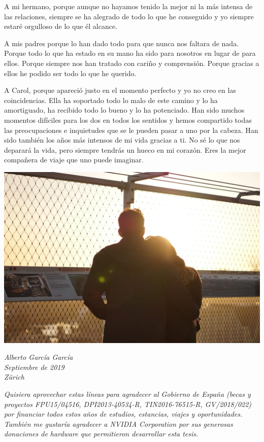 A mi hermano, porque aunque no hayamos tenido la mejor ni la más intensa de las relaciones, siempre se ha alegrado de todo lo que he conseguido y yo siempre estaré orgulloso de lo que él alcance.

A mis padres porque lo han dado todo para que nunca nos faltara de nada. Porque todo lo que ha estado en su mano ha sido para nosotros en lugar de para ellos. Porque siempre nos han tratado con cariño y comprensión. Porque gracias a ellos he podido ser todo lo que he querido.

\newpage

A Carol, porque apareció justo en el momento perfecto y yo no creo en las coincidencias. Ella ha soportado todo lo malo de este camino y lo ha amortiguado, ha recibido todo lo bueno y lo ha potenciado. Han sido muchos momentos difíciles para los dos en todos los sentidos y hemos compartido todas las preocupaciones e inquietudes que se le pueden pasar a uno por la cabeza. Han sido también los años más intensos de mi vida gracias a ti. No sé lo que nos deparará la vida, pero siempre tendrás un hueco en mi corazón. Eres la mejor compañera de viaje que uno puede imaginar.\\

\begin{center}
	\includegraphics[width=0.9\linewidth]{Figures/Ack/carol}
\end{center}

\noindent\emph{Alberto García García}\\
\emph{Septiembre de 2019}\\
\emph{Zürich}\\

\vfill

\emph{Quisiera aprovechar estas líneas para agradecer al Gobierno de España (becas y proyectos FPU15/04516, DPI2013-40534-R, TIN2016-76515-R, GV/2018/022) por financiar todos estos años de estudios, estancias, viajes y oportunidades. También me gustaría agradecer a NVIDIA Corporation por sus generosas donaciones de hardware que permitieron desarrollar esta tesis.}\\

